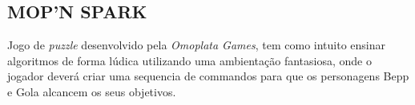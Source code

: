 \subsection{MOP'N SPARK}

Jogo de \textit{puzzle} desenvolvido pela \textit{Omoplata Games}, tem como intuito ensinar algoritmos de forma lúdica utilizando uma ambientação fantasiosa, onde o jogador deverá criar uma sequencia de commandos para que os personagens Bepp e Gola alcancem os seus objetivos. \cite{MOPNSPARKSteam}


